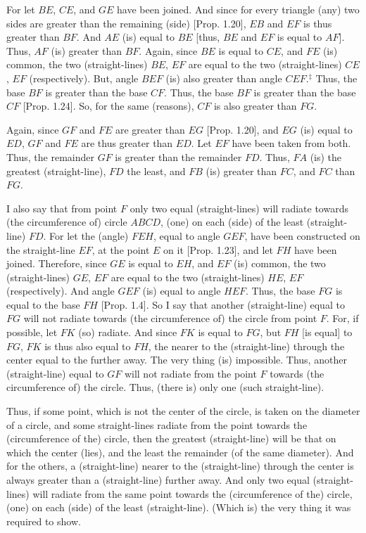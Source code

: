 \begin{Parallel}{}{}
{For let $BE$, $CE$, and $GE$ have been joined. And since for every triangle
(any) two sides are greater than the remaining (side) [Prop. 1.20],
$EB$ and $EF$ is thus greater than $BF$. And $AE$ (is) equal to $BE$ [thus,
$BE$ and $EF$ is equal to $AF$]. Thus, $AF$ (is) greater than $BF$. Again,
since $BE$ is equal to $CE$, and $FE$ (is) common, the two (straight-lines)
$BE$, $EF$ are equal to the two (straight-lines) $CE$, $EF$ (respectively). But, angle $BEF$ (is)
also greater than angle $CEF$.$^\ddag$ Thus, the base $BF$ is greater than the base $CF$.
Thus, the base $BF$ is greater than the base $CF$ [Prop. 1.24]. So, for the same (reasons), $CF$ is also greater than $FG$.

Again, since $GF$ and $FE$ are greater than $EG$ [Prop. 1.20], and $EG$
(is) equal to $ED$, $GF$ and $FE$ are thus greater than $ED$. Let $EF$ have been
taken from both. Thus, the remainder $GF$ is greater than the remainder $FD$.
Thus, $FA$ (is) the greatest  (straight-line), $FD$ the least, and $FB$ (is) greater than $FC$, and $FC$ than $FG$.

I also say that from point $F$ only two equal (straight-lines) will radiate
towards (the circumference of) circle $ABCD$, (one) on each (side) of the
least (straight-line) $FD$. For let the (angle) $FEH$, equal to angle $GEF$, have been constructed on the straight-line $EF$, at the point $E$ on it [Prop. 1.23], and
let $FH$ have been joined. Therefore, since $GE$ is equal to $EH$, and $EF$ (is) common, the two (straight-lines) $GE$, $EF$ are equal to the two (straight-lines)
$HE$, $EF$ (respectively). And angle $GEF$ (is) equal to angle $HEF$. Thus, the base $FG$ is
equal to the base $FH$ [Prop. 1.4]. So I say that another (straight-line)
equal to $FG$
will not radiate towards (the circumference of)
the circle from point $F$. For, if possible, let $FK$ (so) radiate. And since
$FK$ is equal to $FG$, but $FH$ [is equal] to $FG$, $FK$ is thus also equal to
$FH$, the nearer to the (straight-line) through the center equal to the
further away. The very thing (is) impossible. Thus, another (straight-line)
equal to $GF$ will not radiate from the point $F$ towards (the circumference of) the circle.
Thus, (there is) only one (such straight-line).

Thus, if some point, which is not the
center of the circle, is taken on the diameter of a circle,
and some straight-lines radiate from the point towards
the (circumference of the) circle, then the greatest (straight-line) will be that on which
the center (lies), and the least the remainder (of the same diameter). And
for the others, a (straight-line) nearer to the (straight-line) through the center is always
greater than a (straight-line) further away. And only two equal (straight-lines)
will radiate from the same point towards the (circumference of the) circle,  (one)
on each (side) of the least (straight-line). (Which is) the very thing it was required to show.}
\end{Parallel}


